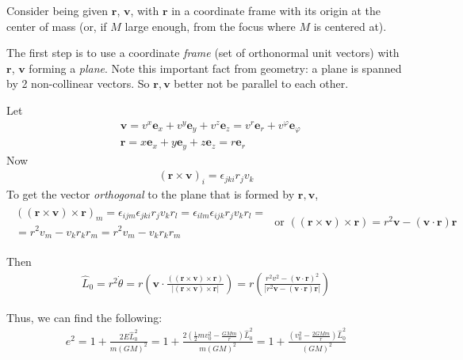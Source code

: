 Consider being given $\mathbf{r}$, $\mathbf{v}$, with $\mathbf{r}$ in a coordinate frame with its origin at the center of mass (or, if $M$ large enough, from the focus where $M$ is centered at). 

The first step is to use a coordinate \emph{frame} (set of orthonormal unit vectors) with $\mathbf{r}$, $\mathbf{v}$ forming a \emph{plane}. Note this important fact from geometry: a plane is spanned by 2 non-collinear vectors. So $\mathbf{r}, \mathbf{v}$ better not be parallel to each other.

Let 
\[
\begin{aligned} 
	& \mathbf{v} = v^x \mathbf{e}_x + v^y \mathbf{e}_y + v^z \mathbf{e}_z = v^r \mathbf{e}_r + v^{\varphi} \mathbf{e}_{\varphi} \\ 
	& \mathbf{r} = x \mathbf{e}_x + y \mathbf{e}_y + z \mathbf{e}_z = r\mathbf{e}_r
\end{aligned} 
\]
Now 
\[
\begin{gathered}
(\mathbf{r} \times \mathbf{v})_i = \epsilon_{jki} r_j v_k 
\end{gathered}
\]
To get the vector \emph{orthogonal} to the plane that is formed by $\mathbf{r}, \mathbf{v}$, 
\[
\begin{gathered}
\begin{gathered}
	((\mathbf{r} \times \mathbf{v}) \times \mathbf{r})_m = \epsilon_{ijm} \epsilon_{jki} r_j v_k r_l = \epsilon_{ilm} \epsilon_{ijk} r_j v_k r_l = \\
	= r^2 v_m - v_k r_k r_m = r^2 v_m - v_k r_k r_m
\end{gathered}
\text{ or } ((\mathbf{r} \times \mathbf{v}) \times \mathbf{r}) = r^2 \mathbf{v} - (\mathbf{v} \cdot \mathbf{r}) \mathbf{r}
\end{gathered}
\]

Then
\[
\begin{gathered}
\widehat{L}_0 = r^2 \dot{\theta} = r \left( \mathbf{v} \cdot  \frac{ ((\mathbf{r} \times \mathbf{v}) \times \mathbf{r}) }{ | (\mathbf{r} \times \mathbf{v} ) \times \mathbf{r} | } \right) = r \left( \frac{r^2 v^2 - (\mathbf{v} \cdot \mathbf{r})^2 }{ |r^2 \mathbf{v} - (\mathbf{v} \cdot \mathbf{r}) \mathbf{r} | } \right) 
\end{gathered}
\]

Thus, we can find the following:
\[
\begin{gathered} 
e^2 = 1 + \frac{ 2 E \widehat{L}_0^2 }{ m (GM)^2 } = 1 + \frac{ 2 \left( \frac{1}{2} m v_0^2 - \frac{GM m }{r} \right) \widehat{L}_0^2 }{ m (GM)^2 }  = 1 + \frac{\left( v_0^2 - \frac{2GMm}{r} \right) \widehat{L}_0^2 }{ (GM)^2 }
\end{gathered} 
\]

